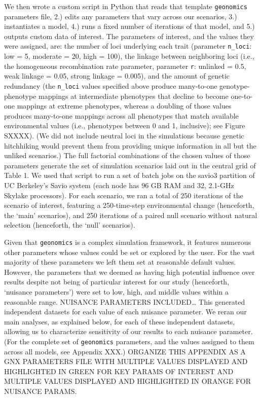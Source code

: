 \documentclass[9pt,twocolumn,twoside,lineno]{pnas-new}
\begin{document}
{We then wrote a custom script in Python that reads that template \texttt{geonomics}
parameters file, 2.) edits any parameters that vary 
across our scenarios, 3.) instantiates a model, 4.) runs a fixed number of iterations 
of that model, and 5.) outputs custom data of interest. The parameters of interest, 
and the values they were assigned, are: the number of loci underlying each trait 
(parameter \texttt{n\_loci}: low = 5, moderate = 20, high = 100), the linkage between 
neighboring loci (i.e., the homogeneous recombination rate parameter, parameter \texttt{r}: unlinked = 
0.5, weak linkage = 0.05, strong linkage = 0.005), and the amount of genetic redundancy
(the \texttt{n\_loci} values specified above produce many-to-one genotype-phenotype mappings
at intermediate phenotypes that decline to become one-to-one mappings at extreme phenotypes,
whereas a doubling of those values produces many-to-one mappings across
all phenotypes that match available environmental values (i.e., phenotypes between 0 and 1, inclusive); see Figure SXXXX).
(We did not include neutral loci in the simulations because genetic
hitchhiking would prevent them from providing unique information
in all but the unliked scenarios.)
The full factorial combinations
of the chosen values of those parameters generate the set
of simulation scenarios laid out in
the central grid of Table 1. We used that script to run a set of batch jobs on the 
savio3 partition of UC Berkeley’s Savio system (each node has 96 GB RAM and 32, 
2.1-GHz Skylake processors). For each scenario, we ran a total of 250 iterations of 
the scenario of interest, featuring a 250-time-step environmental change (henceforth, 
the ‘main’ scenarios), and 250 iterations of a paired null scenario without natural 
selection (henceforth, the ‘null’ scenarios). 


Given that \texttt{geonomics} is a complex simulation framework, it features numerous other 
parameters whose values could be set or explored by the user. For the vast majority of
these parameters we left them set at reasonable default values. However, the 
parameters that we deemed as having high potential influence over results despite not 
being of particular interest for our study (henceforth, ‘nuisance parameters’) were 
set to low, high, and middle values within a reasonable range. NUISANCE PARAMETERS 
INCLUDED… This generated independent datasets for each value of each nuisance 
parameter. We reran our main analyses, as explained below, for each of these 
independent datasets, allowing us to characterize sensitivity of our results to each 
nuisance parameter. (For the complete set of \texttt{geonomics} parameters, and the values 
assigned to them across all models, see Appendix XXX.) ORGANIZE THIS APPENDIX AS A GNX
PARAMETERS FILE WITH MULTIPLE VALUES DISPLAYED AND HIGHLIGHTED IN GREEN FOR KEY PARAMS
OF INTEREST AND MULTIPLE VALUES DISPLAYED AND HIGHLIGHTED IN ORANGE FOR NUISANCE PARAMS.


}
\end{document}
